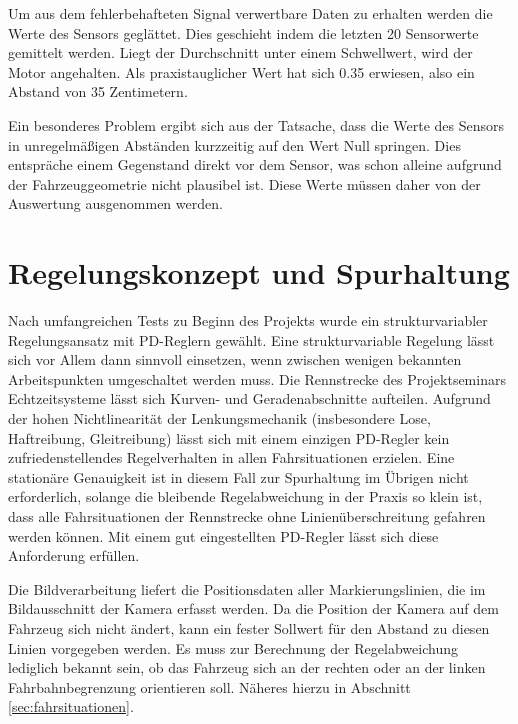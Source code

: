 Um aus dem fehlerbehafteten Signal verwertbare Daten zu erhalten werden die Werte des Sensors geglättet. Dies geschieht indem die letzten 20 Sensorwerte gemittelt werden. Liegt der Durchschnitt unter einem Schwellwert, wird der Motor angehalten. Als praxistauglicher Wert hat sich 0.35 erwiesen, also ein Abstand von 35 Zentimetern.

Ein besonderes Problem ergibt sich aus der Tatsache, dass die Werte des Sensors in unregelmäßigen Abständen kurzzeitig auf den Wert Null springen. Dies entspräche einem Gegenstand direkt vor dem Sensor, was schon alleine aufgrund der Fahrzeuggeometrie nicht plausibel ist. Diese Werte müssen daher von der Auswertung ausgenommen werden.


\section{Regelungskonzept und Spurhaltung}
\label{sec:wallfollower}

Nach umfangreichen Tests zu Beginn des Projekts wurde ein strukturvariabler Regelungsansatz mit PD-Reglern gewählt. Eine strukturvariable Regelung lässt sich vor Allem dann sinnvoll einsetzen, wenn zwischen wenigen bekannten Arbeitspunkten umgeschaltet werden muss. Die Rennstrecke des Projektseminars Echtzeitsysteme lässt sich Kurven- und Geradenabschnitte aufteilen. Aufgrund der hohen Nichtlinearität der Lenkungsmechanik (insbesondere Lose, Haftreibung, Gleitreibung) lässt sich mit einem einzigen PD-Regler kein zufriedenstellendes Regelverhalten in allen Fahrsituationen erzielen. Eine stationäre Genauigkeit ist in diesem Fall zur Spurhaltung im Übrigen nicht erforderlich, solange die bleibende Regelabweichung in der Praxis so klein ist, dass alle Fahrsituationen der Rennstrecke ohne Linienüberschreitung gefahren werden können. Mit einem gut eingestellten PD-Regler lässt sich diese Anforderung erfüllen.

Die Bildverarbeitung liefert die Positionsdaten aller Markierungslinien, die im Bildausschnitt der Kamera erfasst werden. Da die Position der Kamera auf dem Fahrzeug sich nicht ändert, kann ein fester Sollwert für den Abstand zu diesen Linien vorgegeben werden. Es muss zur Berechnung der Regelabweichung lediglich bekannt sein, ob das Fahrzeug sich an der rechten oder an der linken Fahrbahnbegrenzung orientieren soll. Näheres hierzu in Abschnitt \ref{sec:fahrsituationen}.


